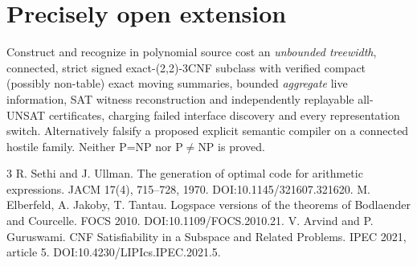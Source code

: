 \documentclass[11pt]{article}
\begin{document}
\section{Precisely open extension}
Construct and recognize in polynomial source cost an \emph{unbounded treewidth}, connected, strict signed exact-(2,2)-3CNF subclass with verified compact (possibly non-table) exact moving summaries, bounded \emph{aggregate} live information, SAT witness reconstruction and independently replayable all-UNSAT certificates, charging failed interface discovery and every representation switch. Alternatively falsify a proposed explicit semantic compiler on a connected hostile family. Neither P=NP nor P$\ne$NP is proved.

\begin{thebibliography}{3}
 R. Sethi and J. Ullman. The generation of optimal code for arithmetic expressions. JACM 17(4), 715--728, 1970. DOI:10.1145/321607.321620.
 M. Elberfeld, A. Jakoby, T. Tantau. Logspace versions of the theorems of Bodlaender and Courcelle. FOCS 2010. DOI:10.1109/FOCS.2010.21.
 V. Arvind and P. Guruswami. CNF Satisfiability in a Subspace and Related Problems. IPEC 2021, article 5. DOI:10.4230/LIPIcs.IPEC.2021.5.
\end{thebibliography}
\end{document}
